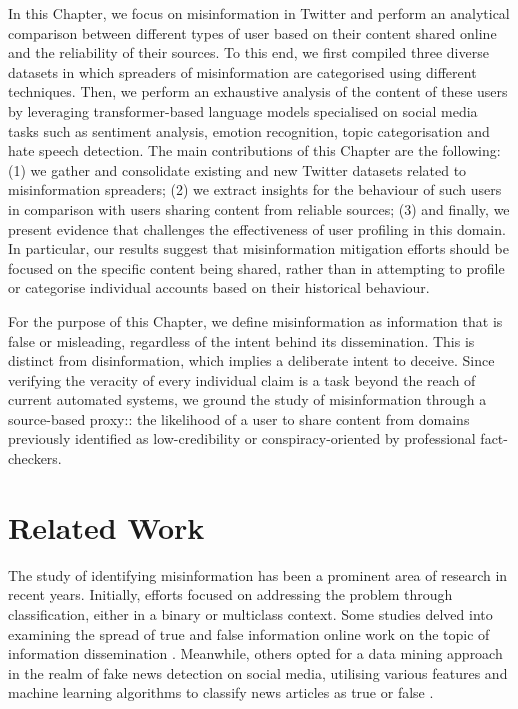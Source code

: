 In this Chapter, we focus on misinformation in Twitter and perform an analytical comparison between %
different types of user based on their content shared online and the reliability of their sources.  %
To this end, we first compiled three diverse datasets in which spreaders of misinformation are categorised using different techniques. Then, we perform an exhaustive analysis of the content of these users by leveraging transformer-based language models specialised on social media tasks such as sentiment analysis, emotion recognition, topic categorisation and hate speech detection. The main contributions of this Chapter are the following: (1) we gather and consolidate existing and new Twitter datasets related to misinformation spreaders;  (2) we extract insights for the behaviour of such users in comparison with users sharing content from reliable sources; (3) and finally, we present evidence that challenges the effectiveness of user profiling in this domain. In particular, our results suggest that misinformation mitigation efforts should be focused on the specific content being shared, rather than in attempting to profile or categorise individual accounts based on their historical behaviour.

For the purpose of this Chapter, we define misinformation as information that is false or misleading, regardless of the intent behind its dissemination. This is distinct from disinformation, which implies a deliberate intent to deceive. Since verifying the veracity of every individual claim is a task beyond the reach of current automated systems, we ground the study of misinformation through a source-based proxy:: the likelihood of a user to share content from domains previously identified as low-credibility or conspiracy-oriented by professional fact-checkers. 

\section{Related Work}

The study of identifying misinformation has been a prominent area of research in recent years. Initially, efforts focused on addressing the problem through classification, either in a binary or multiclass context. Some studies delved into examining the spread of true and false information online work on the topic of information dissemination \cite{vosoughi2018spread}. Meanwhile, others opted for a data mining approach in the realm of fake news detection on social media, utilising various features and machine learning algorithms to classify news articles as true or false \cite{shu2017fake}.

